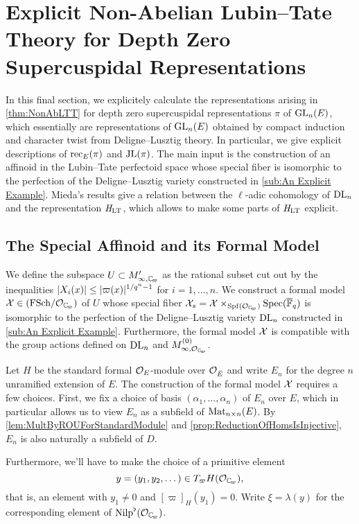 \documentclass[../main.tex]{subfiles}
\begin{document}
\section{Explicit Non-Abelian Lubin--Tate Theory for Depth Zero Supercuspidal
Representations} %
\label{sec:Explicit Non-Abelian Lubin-Tate Theory for Depth Zero Supercuspidal Representations}
In this final section, we explicitely calculate the representations
arising in \cref{thm:NonAbLTT} for depth zero supercuspidal
representations $\pi$ of $\operatorname{GL}_n(E)$, which essentially are representations
of $\operatorname{GL}_n(E)$
obtained by compact induction and character twist from Deligne--Lusztig theory. In
particular, we give explicit descriptions of $\mathrm{rec}_E(\pi)$ and $\mathrm{JL}(\pi)$. 
The main input is the construction of an affinoid in the Lubin--Tate perfectoid
space whose special fiber is isomorphic to the perfection of the 
Deligne--Lusztig variety constructed in \cref{sub:An Explicit Example}.
Mieda's results give a relation between the $\ell$-adic cohomology of $\mathrm{DL}_n$
and the representation $\mathit H_{\mathrm{LT}}$, which allows to make some parts of $\mathit H_{\mathrm{LT}}$
explicit.

\subsection{The Special Affinoid and its Formal Model} %
\label{sub:The Special Affinoid}
We define the subspace $U \subset M'_{\infty,\Cp}$ as the rational
subset cut out by the inequalities $\lvert X_i(x) \rvert \leq \lvert \varpi(x) \rvert^{1/q^n-1}$ for
$i = 1, \dots, n$. We construct a formal model $\cX \in \FSchOver {\cO_{\Cp}}$
of $U$ whose special fiber $\cX_s = 
\cX \times_{\spf(\cO_{\Cp})}\spec(\bar \FF_q)$ is isomorphic to the perfection of the
Deligne--Lusztig variety $\mathrm{DL}_n$ constructed in  \cref{sub:An Explicit Example}.
Furthermore, the formal model $\mathcal{X}$ is compatible with the group actions
defined on $\mathrm{DL}_n$ and $M_{\infty, \cO_\Cp}^{(0)}$. 

Let $H$ be the standard formal $\mathcal{O}_E$-module over $\mathcal{O}_{\breve {E}}$ and write
$E_n$ for the degree $n$ unramified extension of $E$. 
The construction of the formal model $\mathcal{X}$ requires a few choices. 
First, we fix a choice of basis $(\alpha_1, \dots, \alpha_n)$ of $E_n$ over $E$, 
which in particular allows us to view $E_n$ as a subfield of $\operatorname{Mat}_{n \times n}(E)$. 
By \cref{lem:MultByROUForStandardModule} and 
\cref{prop:ReductionOfHomsIsInjective}, $E_n$ is also naturally a subfield of
$D$.

Furthermore, we'll have to make the choice of a primitive element 
$$y = (y_1, y_2, \dots) \in T_\varpi H(\cO_\Cp),$$ that is,
an element with $y_1 \neq 0$ and $[\varpi]_H(y_1) = 0$. Write $\xi = \lambda(y)$ 
for the corresponding element of $\Nilp^\flat(\cO_\Cp)$. 
\end{document}
